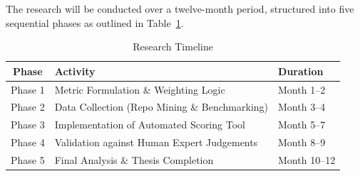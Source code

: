 The research will be conducted over a twelve-month period, structured into five sequential phases as outlined in Table~\ref{tab:timeline}.

\begin{table}[h]
    \centering
    \renewcommand{\arraystretch}{1.4}
    \begin{tabular}{|c|l|l|}
        \hline
        \textbf{Phase} & \textbf{Activity} & \textbf{Duration} \\
        \hline
        Phase 1 & Metric Formulation \& Weighting Logic & Month 1--2 \\
        \hline
        Phase 2 & Data Collection (Repo Mining \& Benchmarking) & Month 3--4 \\
        \hline
        Phase 3 & Implementation of Automated Scoring Tool & Month 5--7 \\
        \hline
        Phase 4 & Validation against Human Expert Judgements & Month 8--9 \\
        \hline
        Phase 5 & Final Analysis \& Thesis Completion & Month 10--12 \\
        \hline
    \end{tabular}
    \caption{Research Timeline}
    \label{tab:timeline}
\end{table}
